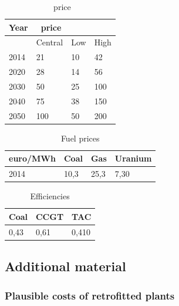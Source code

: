 \begin{table}
	\centering
	\caption{\coo\ price}
	\label{tab:CO2_price}
	\begin{tabular}{llll}
		\toprule
		Year & \coo\ price & & \\
		\midrule
		& Central & Low & High \\
		2014 & 21 & 10 & 42 \\
		2020 & 28 & 14 & 56 \\
		2030 & 50 & 25 & 100 \\
		2040 & 75 & 38 & 150 \\
		2050 & 100 & 50 & 200 \\
		\bottomrule
	\end{tabular}
\end{table}



\begin{table}[!ht]
	\centering
	\caption{Fuel prices}
	\label{tab:Fuel_prices}
	\begin{tabular}{llll}
		\toprule
		euro/MWh & Coal & Gas & Uranium \\
		\midrule
		2014 & 10,3 & 25,3 & 7,30 \\
		\bottomrule
	\end{tabular}
\end{table}

\begin{table}
	\centering
	\caption{Efficiencies}
	\label{tab:Efficiencies}
	\begin{tabular}{lll}
		\toprule
		Coal & CCGT & TAC \\
		\midrule
		0,43 & 0,61 & 0,410 \\
		\bottomrule
	\end{tabular}
\end{table}

\clearpage
\subsection{Additional material}

\subsubsection{Plausible costs of retrofitted plants}


